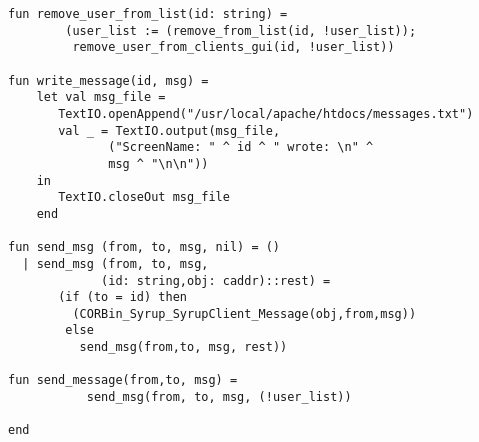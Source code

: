 \begin{verbatim}
fun remove_user_from_list(id: string) = 
        (user_list := (remove_from_list(id, !user_list));
         remove_user_from_clients_gui(id, !user_list))

fun write_message(id, msg) = 
    let val msg_file = 
       TextIO.openAppend("/usr/local/apache/htdocs/messages.txt")
       val _ = TextIO.output(msg_file, 
              ("ScreenName: " ^ id ^ " wrote: \n" ^
              msg ^ "\n\n"))
    in 
       TextIO.closeOut msg_file
    end

fun send_msg (from, to, msg, nil) = ()
  | send_msg (from, to, msg, 
             (id: string,obj: caddr)::rest) = 
       (if (to = id) then 
         (CORBin_Syrup_SyrupClient_Message(obj,from,msg))
        else 
          send_msg(from,to, msg, rest))

fun send_message(from,to, msg) = 
           send_msg(from, to, msg, (!user_list)) 

end 
\end{verbatim}
